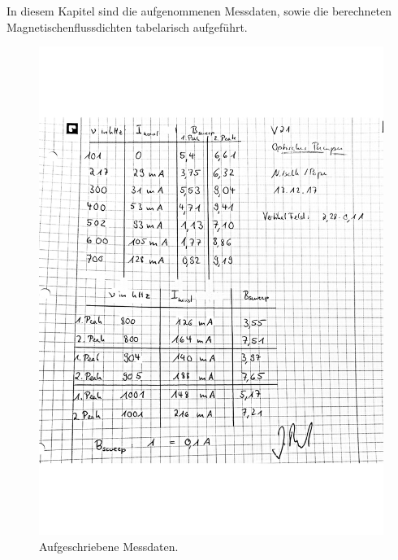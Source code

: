 In diesem Kapitel sind die aufgenommenen Messdaten, sowie die berechneten
Magnetischenflussdichten tabelarisch aufgeführt.





\newpage

\begin{figure}[h]
  \centering
  \includegraphics[width = \textwidth]{Pics/V21_Messdaten}
  \caption{Aufgeschriebene Messdaten.}
  \label{fig:aufgeschMessdaten}
\end{figure}
